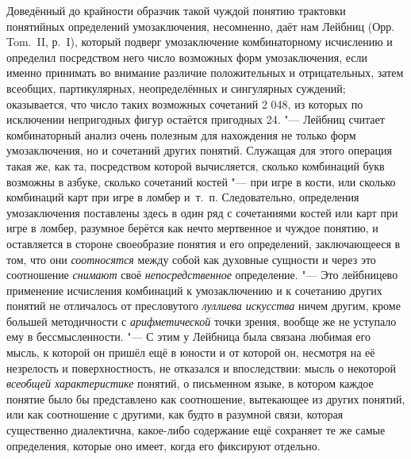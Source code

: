 Доведённый до крайности образчик такой чуждой понятию
трактовки понятийных определений умозаключения, несомненно, даёт нам Лейбниц
(Орр. Tom.~II, р.~I), который подверг умозаключение
комбинаторному исчислению и определил посредством него число возможных форм
умозаключения, если именно принимать во внимание различие положительных и
отрицательных, затем всеобщих, партикулярных, неопределённых и сингулярных
суждений; оказывается, что число таких возможных сочетаний 2 048, из
которых по исключении непригодных фигур остаётся пригодных 24. "---
Лейбниц считает комбинаторный анализ очень полезным для
нахождения не только форм умозаключения, но и сочетаний других понятий.
Служащая для этого операция такая же, как та, посредством которой
вычисляется, сколько комбинаций букв возможны в азбуке, сколько сочетаний
костей "--- при игре в кости, или сколько комбинаций карт при
игре в ломбер и~т.~п. Следовательно, определения умозаключения поставлены
здесь в один ряд с сочетаниями костей или карт при игре в ломбер, разумное
берётся как нечто мертвенное и чуждое понятию, и оставляется в стороне
своеобразие понятия и его определений, заключающееся в том, что они
{\em соотносятся} между
собой как духовные сущности и через это соотношение
{\em снимают} своё
{\em непосредственное}
определение. "--- Это лейбницево
применение исчисления комбинаций к умозаключению и к сочетанию других
понятий не отличалось от пресловутого
{\em луллиева искусства}
ничем другим, кроме большей методичности с
{\em арифметической}
точки зрения, вообще же не уступало ему в бессмысленности. "---
С этим у Лейбница была связана любимая его мысль, к которой
он пришёл ещё в юности и от которой он, несмотря на её незрелость и
поверхностность, не отказался и впоследствии: мысль о некоторой
{\em всеобщей характеристике}
понятий, о письменном языке, в котором каждое понятие было бы
представлено как соотношение, вытекающее из других понятий, или как
соотношение с другими, как будто в разумной связи, которая существенно
диалектична, какое-либо содержание ещё сохраняет те же самые определения,
которые оно имеет, когда его фиксируют отдельно.


